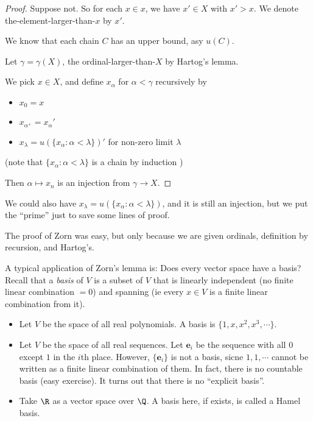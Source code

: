 \documentclass[a4paper]{article}
\begin{document}
\begin{proof}
  Suppose not. So for each $x\in x$, we have $x'\in X$ with $x' > x$. We denote the-element-larger-than-$x$ by $x'$.

  We know that each chain $C$ has an upper bound, asy $u(C)$.

  Let $\gamma = \gamma(X)$, the ordinal-larger-than-$X$ by Hartog's lemma.

  We pick $x\in X$, and define $x_\alpha$ for $\alpha < \gamma$ recursively by
  \begin{itemize}
    \item $x_0 = x$
    \item $x_{\alpha^+} = x_\alpha'$
    \item $x_{\lambda} = u(\{x_\alpha: \alpha < \lambda\})'$ for non-zero limit $\lambda$
  \end{itemize}
  (note that $\{x_\alpha: \alpha < \lambda\}$ is a chain by induction )

  Then $\alpha \mapsto x_n$ is an injection from $\gamma\to X$.
\end{proof}
\note We could also have $x_\lambda = u(\{x_\alpha : \alpha < \lambda\})$, and it is still an injection, but we put the ``prime'' just to save some lines of proof.

\note The proof of Zorn was easy, but only because we are given ordinals, definition by recursion, and Hartog's.

A typical application of Zorn's lemma is: Does every vector space have a basis? Recall that a \emph{basis} of $V$ is a subset of $V$ that is linearly independent (no finite linear combination $= 0$) and spanning (ie every $x\in V$ is a finite linear combination from it).

\begin{eg}\leavevmode
  \begin{itemize}
    \item Let $V$ be the space of all real polynomials. A basis is $\{1, x, x^2, x^3, \cdots\}$.
    \item Let $V$ be the space of all real sequences. Let $\mathbf{e}_i$ be the sequence with all $0$ except $1$ in the $i$th place. However, $\{\mathbf{e}_i\}$ is not a basis, sicne $1, 1, \cdots$ cannot be written as a finite linear combination of them. In fact, there is no countable basis (easy exercise). It turns out that there is no ``explicit basis''.
    \item Take $\R$ as a vector space over $\Q$. A basis here, if exists, is called a Hamel basis.
  \end{itemize}
\end{eg}
\end{document}
